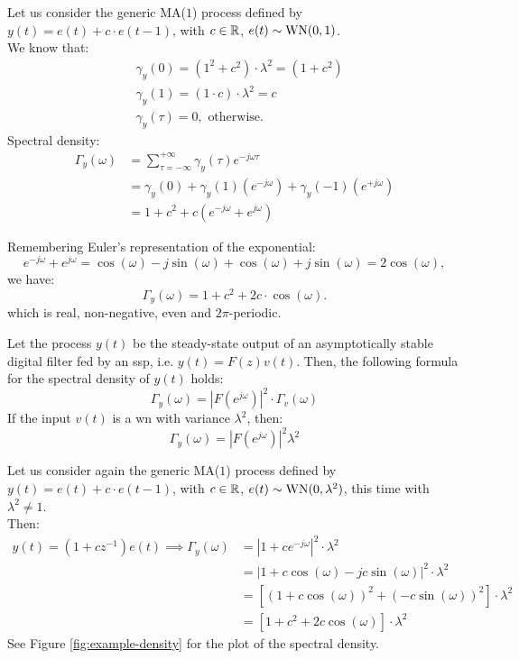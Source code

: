 \begin{exa}
Let us consider the generic MA($1$) process defined by $y(t)=e(t)+c \cdot e(t-1)$, with $c \in \mathbb{R}$, $e(t)\sim \operatorname{WN}(0,1)$.\\
We know that:
\begin{align*}
	&\gamma_{y}(0)=(1^{2}+c^{2})\cdot \lambda^{2}=(1+c^{2})\\
	&\gamma_{y}(1)=(1 \cdot c) \cdot \lambda^{2}=c \\
	&\gamma_{y}(\tau)=0, \text{ otherwise.}
\end{align*}
Spectral density:
\begin{align*}
	\Gamma_{y}(\omega)&=\sum_{\tau=-\infty}^{+\infty} \gamma_{y}(\tau) e^{-j \omega \tau}\\
	&=\gamma_{y}(0)+\gamma_{y}(1)(e^{-j \omega})+\gamma_{y}(-1)(e^{+j \omega}) \\
	&=1+c^{2}+c(e^{-j \omega}+e^{j \omega})
\end{align*}

Remembering Euler's representation of the exponential:
$$
	e^{-j \omega}+e^{j \omega}=\cos (\omega)-j \sin (\omega)+\cos (\omega)+j \sin (\omega)=2 \cos (\omega),
$$
we have:
$$
	\Gamma_y(\omega)=1+c^{2}+2 c \cdot \cos (\omega).
$$
which is real, non-negative, even and $2 \pi$-periodic.
\end{exa}
Let the process $y(t)$ be the steady-state output of an asymptotically stable digital filter fed by an \gls{ssp}, i.e. $y(t)=F(z) v(t)$. Then, the following formula for the spectral density of $y(t)$ holds:
\[
	\boxed{\Gamma_{y}(\omega)=|F(e^{j \omega})|^{2} \cdot \Gamma_{v}(\omega)}
\]
If the input $v(t)$ is a \gls{wn} with variance $\lambda^{2}$, then:
$$
\Gamma_{y}(\omega)=|F(e^{j \omega})|^{2} \lambda^{2}
$$

Let us consider again the generic MA($1$) process defined by $y(t)=e(t)+c \cdot e(t-1)$, with $c \in \mathbb{R}$, $e(t)\sim \operatorname{WN}(0,\lambda^2)$, this time with $\lambda^2 \neq 1$.\\
Then:
\begin{align*}
	y(t)=\left(1+c z^{-1}\right) e(t) \implies \Gamma_{y}(\omega)&=\left|1+c e^{-j \omega}\right|^{2} \cdot \lambda^{2}\\
	&=\left|1+c \cos (\omega)-j c\sin (\omega)\right|^{2}\cdot\lambda^2\\
	&=[\left(1+c \cos (\omega)\right)^2+\left(-c\sin (\omega)\right)^2]\cdot\lambda^2\\
	&=[1+c^{2}+2 c \cos (\omega)]\cdot\lambda^2
\end{align*}
See Figure \ref{fig:example-density} for the plot of the spectral density.


